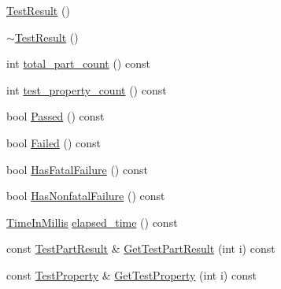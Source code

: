 \begin{DoxyCompactItemize}
\item 
\hyperlink{classtesting_1_1TestResult_a434977b0f85d921ae7a2f7ae506576cf}{\-Test\-Result} ()
\item 
\hyperlink{classtesting_1_1TestResult_ae2816ad307720d4dbdc73941639da1de}{$\sim$\-Test\-Result} ()
\item 
int \hyperlink{classtesting_1_1TestResult_a79a22f05fa96cc8ba6a621af9e03bf90}{total\-\_\-part\-\_\-count} () const 
\item 
int \hyperlink{classtesting_1_1TestResult_aa7f0d1b12451e1f164d0534be7def11e}{test\-\_\-property\-\_\-count} () const 
\item 
bool \hyperlink{classtesting_1_1TestResult_ac97d5073365af8a73262fd9f6bf18656}{\-Passed} () const 
\item 
bool \hyperlink{classtesting_1_1TestResult_a7cf078354304c964c1934f53bf2bb4d7}{\-Failed} () const 
\item 
bool \hyperlink{classtesting_1_1TestResult_a6635ff3817f8f3dccf41e3e3524b8b15}{\-Has\-Fatal\-Failure} () const 
\item 
bool \hyperlink{classtesting_1_1TestResult_adb0618defd0d3f972b68be9f2759be14}{\-Has\-Nonfatal\-Failure} () const 
\item 
\hyperlink{namespacetesting_a338e9fd9474f0d8fafcb28b05f66a630}{\-Time\-In\-Millis} \hyperlink{classtesting_1_1TestResult_a4f91886b546ea9cc5ba2d374a62f3a9c}{elapsed\-\_\-time} () const 
\item 
const \hyperlink{classtesting_1_1TestPartResult}{\-Test\-Part\-Result} \& \hyperlink{classtesting_1_1TestResult_a51d7740d3a08df2f2ad3a1a7e3af3440}{\-Get\-Test\-Part\-Result} (int i) const 
\item 
const \hyperlink{classtesting_1_1TestProperty}{\-Test\-Property} \& \hyperlink{classtesting_1_1TestResult_ab7575be1806ca0e248830159c156f2c3}{\-Get\-Test\-Property} (int i) const 
\end{DoxyCompactItemize}
